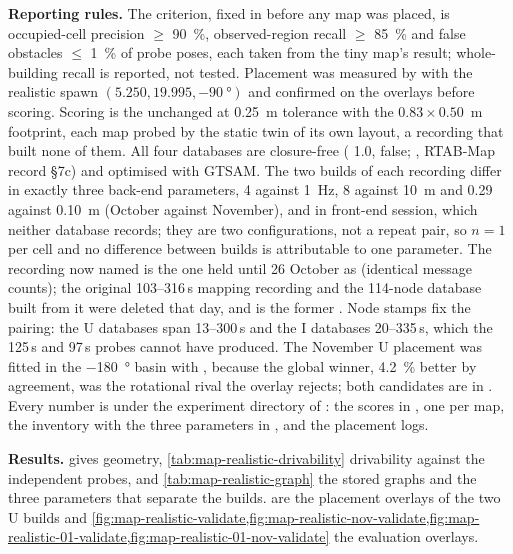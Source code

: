 \documentclass[11pt,a4paper,notitlepage]{report}
\begin{document}
\textbf{Reporting rules.} The criterion, fixed in
 before any map was placed, is occupied-cell
precision $\ge$ \SI{90}{\percent}, observed-region recall $\ge$ \SI{85}{\percent}
and false obstacles $\le$ \SI{1}{\percent} of probe poses, each taken from the
tiny map's result; whole-building recall is reported, not tested. Placement was
measured by  with the realistic spawn
$(5.250, 19.995, \SI{-90}{\degree})$ and confirmed on the overlays before
scoring. Scoring is the unchanged  at
\SI{0.25}{\metre} tolerance with the $0.83\times0.50$~m footprint, each map
probed by the static twin of its own layout, a recording that built none of
them. All four databases are closure-free ( 1.0,
 false; , RTAB-Map record
\S7c) and optimised with GTSAM. The two builds of each recording differ in
exactly three back-end parameters,  4 against
\SI{1}{\hertz},  8 against \SI{10}{\metre} and
 0.29 against \SI{0.10}{\metre} (October against
November), and in front-end session, which neither database records; they are
two configurations, not a repeat pair, so $n=1$ per cell and no difference
between builds is attributable to one parameter. The recording now named
 is the one held until 26 October as
 (identical message counts); the original 103--316\,s mapping
recording and the 114-node database built from it were deleted that day, and
 is the former . Node stamps fix
the pairing: the U databases span 13--300\,s and the I databases 20--335\,s,
which the 125\,s and 97\,s probes cannot have produced. The November U
placement was fitted in the \SI{-180}{\degree} basin with ,
because the global winner, \SI{4.2}{\percent} better by agreement, was the
rotational rival the overlay rejects; both candidates are in
. Every number is under the
experiment directory  of
: the scores in
, one  per map, the
inventory with the three parameters in , and the
placement logs.

\textbf{Results.}  gives geometry,
\cref{tab:map-realistic-drivability} drivability against the independent
probes, and \cref{tab:map-realistic-graph} the stored graphs and the three
parameters that separate the builds.
 are the placement
overlays of the two U builds and
\cref{fig:map-realistic-validate,fig:map-realistic-nov-validate,fig:map-realistic-01-validate,fig:map-realistic-01-nov-validate}
the evaluation overlays.
\end{document}
